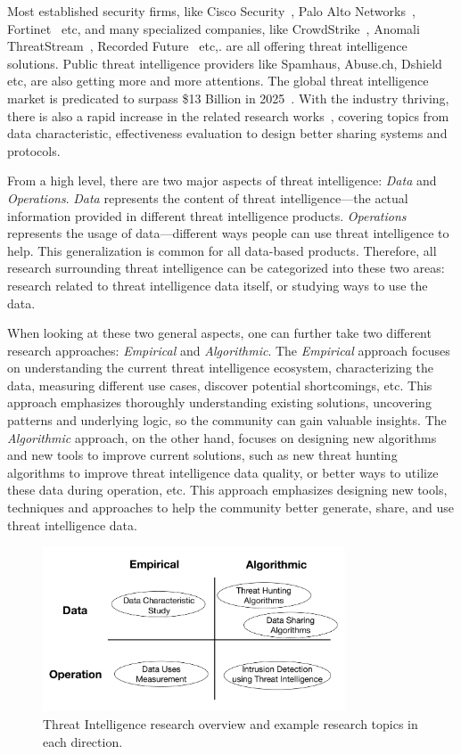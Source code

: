 Most established security firms, like Cisco Security~\cite{ciscotalos}, 
Palo Alto Networks~\cite{panautofocus}, Fortinet~\cite{fortinet} etc, 
and many specialized companies, like CrowdStrike~\cite{crowdstrike}, 
Anomali ThreatStream~\cite{anomali}, Recorded Future~\cite{recordedfuture}
etc,. are all offering threat intelligence solutions. Public threat
intelligence providers like Spamhaus, Abuse.ch, Dshield etc, are also 
getting more and more attentions. The global threat intelligence market is
predicated to surpass \$13 Billion in 2025~\cite{tipredict2018}. With the
industry thriving, there is also a rapid increase in the related research
works~\cite{tounsi2018survey}, covering topics from data characteristic,
effectiveness evaluation to design better sharing systems and protocols.

From a high level, there are two major aspects of threat intelligence: 
\textit{Data} and \textit{Operations}. \textit{Data} represents the content 
of threat intelligence---the actual information provided in different threat
intelligence products. \textit{Operations} represents the usage of 
data---different ways people can use threat intelligence to help. This
generalization is common for all data-based products. Therefore,
all research surrounding threat intelligence can be categorized into
these two areas: research related to threat intelligence data itself, or 
studying ways to use the data.

When looking at these two general aspects, one can further 
take two different research approaches: \textit{Empirical} and 
\textit{Algorithmic}. The \textit{Empirical} approach focuses on 
understanding the current threat intelligence ecosystem, characterizing 
the data, measuring different use cases, discover potential 
shortcomings, etc. This approach emphasizes thoroughly understanding
existing solutions, uncovering patterns and underlying logic, so the 
community can gain valuable insights. The \textit{Algorithmic} approach, 
on the other hand, focuses on designing new algorithms and new tools to 
improve current solutions, such as new threat hunting algorithms to improve 
threat intelligence data quality, or better ways to utilize these data 
during operation, etc. This approach emphasizes designing new tools,
techniques and approaches to help the community better generate, share, 
and use threat intelligence data.

\begin{figure}
\centering
\includegraphics[width=0.8\textwidth]{threat_intel_research_overview.pdf}
\caption{Threat Intelligence research overview and example research
topics in each direction.}
\label{fig:threat_intel_overview}
\end{figure}

